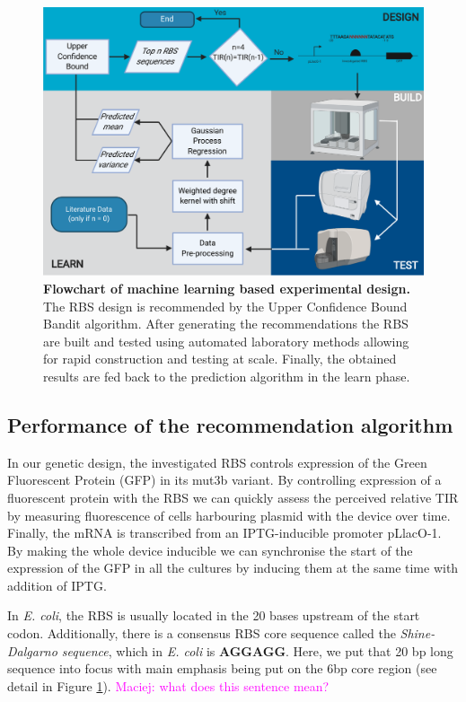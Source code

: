 \documentclass{article}
\newcommand{\mengyan}[1]{\textcolor{magenta}{#1}}
\begin{document}
 

\begin{figure}[h]
    \centering
    \includegraphics[scale=0.7]{plots/Main_Paper/flowchart.pdf}
    \caption{\textbf{Flowchart of machine learning based experimental design.} The RBS design is recommended by the Upper Confidence Bound Bandit algorithm. After generating the recommendations the RBS are built and tested using automated laboratory methods allowing for rapid construction and testing at scale. Finally, the obtained results are fed back to the prediction algorithm in the learn phase. }
    \label{fig: Flowchart}
\end{figure}



\subsection{Performance of the recommendation algorithm}
In our genetic design, the investigated RBS controls expression of the Green Fluorescent Protein (GFP) in its mut3b variant. 
By controlling expression of a fluorescent protein with the RBS we can quickly assess the perceived relative TIR by measuring fluorescence of cells harbouring plasmid with the device over time.
Finally, the mRNA is transcribed from an IPTG-inducible promoter pLlacO-1. 
By making the whole device inducible we can synchronise the start of the expression of the GFP in all the cultures by inducing them at the same time with addition of IPTG.

In \emph{E. coli}, the RBS is usually located in the 20 bases upstream of the start codon. 
Additionally, there is a consensus RBS core sequence called the \textit{Shine-Dalgarno sequence}, which in \emph{E. coli} is \textbf{AGGAGG}. 
Here, we put that 20 bp long sequence into focus with main emphasis being put on the 6bp core region (see detail in Figure \ref{fig: Flowchart}). \mengyan{Maciej: what does this sentence mean?}
\end{document}
